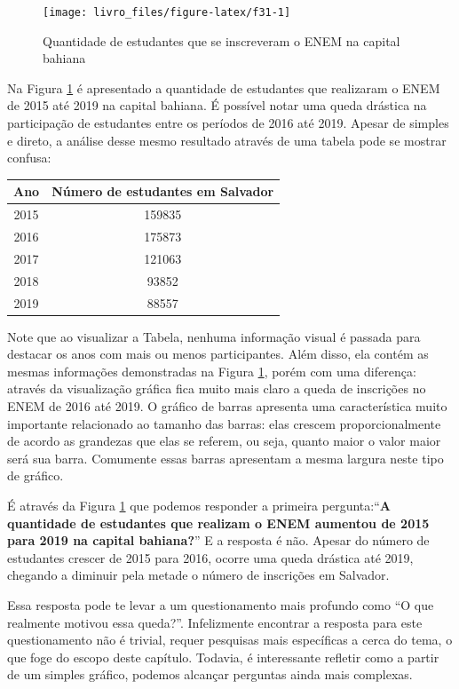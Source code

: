 \documentclass[
  oneside]{book}
\begin{document}
\begin{figure}

{\centering \texttt{[image: livro\_files/figure-latex/f31-1]} 

}

\caption{Quantidade de estudantes que se inscreveram o ENEM na capital bahiana}\label{fig:f31}
\end{figure}

Na Figura \ref{fig:f31} é apresentado a quantidade de estudantes que realizaram o ENEM de 2015 até 2019 na capital bahiana. É possível notar uma queda drástica na participação de estudantes entre os períodos de 2016 até 2019. Apesar de simples e direto, a análise desse mesmo resultado através de uma tabela pode se mostrar confusa:

\begin{longtable}[]{@{}cc@{}}
\toprule
Ano & Número de estudantes em Salvador\tabularnewline
\midrule
\endhead
2015 & 159835\tabularnewline
2016 & 175873\tabularnewline
2017 & 121063\tabularnewline
2018 & 93852\tabularnewline
2019 & 88557\tabularnewline
\bottomrule
\end{longtable}

Note que ao visualizar a Tabela, nenhuma informação visual é passada para destacar os anos com mais ou menos participantes. Além disso, ela contém as mesmas informações demonstradas na Figura \ref{fig:f31}, porém com uma diferença: através da visualização gráfica fica muito mais claro a queda de inscrições no ENEM de 2016 até 2019. O gráfico de barras apresenta uma característica muito importante relacionado ao tamanho das barras: elas crescem proporcionalmente de acordo as grandezas que elas se referem, ou seja, quanto maior o valor maior será sua barra. Comumente essas barras apresentam a mesma largura neste tipo de gráfico.

É através da Figura \ref{fig:f31} que podemos responder a primeira pergunta:``\textbf{A quantidade de estudantes que realizam o ENEM aumentou de 2015 para 2019 na capital bahiana?}'' E a resposta é não. Apesar do número de estudantes crescer de 2015 para 2016, ocorre uma queda drástica até 2019, chegando a diminuir pela metade o número de inscrições em Salvador.

Essa resposta pode te levar a um questionamento mais profundo como ``O que realmente motivou essa queda?''. Infelizmente encontrar a resposta para este questionamento não é trivial, requer pesquisas mais específicas a cerca do tema, o que foge do escopo deste capítulo. Todavia, é interessante refletir como a partir de um simples gráfico, podemos alcançar perguntas ainda mais complexas.
\end{document}
